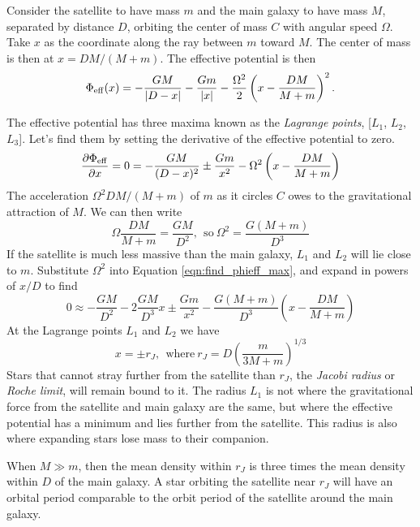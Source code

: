 \documentclass[]{article}
\begin{document}
Consider the satellite to have mass $m$ and the main galaxy to have mass $M$, separated by distance $D$,
orbiting the center of mass $C$ with angular speed $\Omega$.  Take $x$ as the coordinate
along the ray between $m$ toward $M$.  The center of mass is then at $x=DM/(M+m)$.  The
effective potential is then
\begin{equation}
\Phi_\mathrm{eff}(x) = -\frac{GM}{|D-x|} -\frac{Gm}{|x|} - \frac{\Omega^2}{2}\left(x-\frac{DM}{M+m}\right)^2.
\end{equation}

The effective potential has three maxima known as the {\it Lagrange points}, [$L_1$, $L_2$, $L_3$].  Let's find them by setting
the derivative of the effective potential to zero.
\begin{equation}
\label{eqn:find_phieff_max}
\frac{\partial\Phi_\mathrm{eff}}{\partial x} = 0 = -\frac{GM}{(D-x)^2} \pm \frac{Gm}{x^2} - \Omega^2\left(x-\frac{DM}{M+m}\right)
\end{equation}
\noindent
The acceleration $\Omega^2DM/(M+m)$ of $m$ as it circles $C$ owes to the gravitational
attraction of $M$. We can then write
\begin{equation}
\Omega\frac{DM}{M+m}=\frac{GM}{D^2},~~\mathrm{so}~\Omega^2=\frac{G(M+m)}{D^3}
\end{equation}
\noindent
If the satellite is much less massive than the main galaxy, $L_1$ and $L_2$ will lie close to $m$.
Substitute $\Omega^2$ into Equation \ref{eqn:find_phieff_max}, and expand in powers of $x/D$ to find
\begin{equation}
0 \approx -\frac{GM}{D^2} - 2\frac{GM}{D^3}x \pm \frac{Gm}{x^2} - \frac{G(M+m)}{D^3}\left(x-\frac{DM}{M+m}\right)
\end{equation}
\noindent
At the Lagrange points $L_1$ and $L_2$ we have
\begin{equation}
x = \pm r_J, ~~\mathrm{where}~r_J = D\left(\frac{m}{3M+m}\right)^{1/3}
\end{equation}
\noindent
Stars that cannot stray further from the satellite than $r_J$, the {\it Jacobi radius} or {\it Roche limit},
will remain bound to it.  The radius $L_1$ is not where the gravitational force from the satellite and 
main galaxy are the same, but where the effective potential has a minimum and lies further from the satellite.
This radius is also where expanding stars lose mass to their companion.

When $M\gg m$, then the mean density within $r_J$ is three times the mean density within $D$ of the main galaxy.
A star orbiting the satellite near $r_J$ will have an orbital period comparable to the orbit period of the
satellite around the main galaxy.
\end{document}
